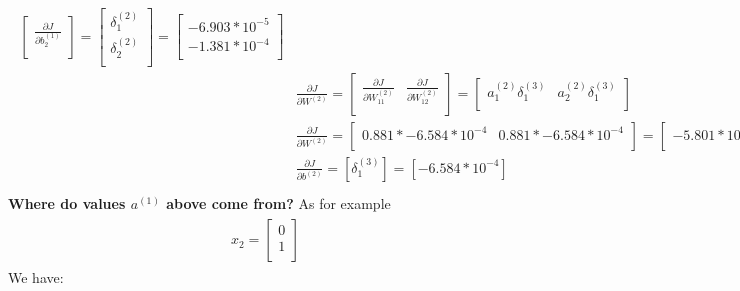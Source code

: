 \documentclass[leqno]{article}
\begin{document}
\begin{gather*}
\begin{split}
\begin{bmatrix}
  \frac{\partial J}{\partial b_2^{(1)}}\\
  \end{bmatrix}
  =
 \begin{bmatrix}
   \delta_1^{(2)}\\ 
   \delta_2^{(2)}\\
  \end{bmatrix}
  =
  \begin{bmatrix}
   -6.903*10^{-5}\\ 
   -1.381*10^{-4}\\
  \end{bmatrix}
\\
&\frac{\partial J}{\partial W^{(2)}} = 
 \begin{bmatrix}
   \frac{\partial J}{\partial W_{11}^{(2)}} & \frac{\partial J}{\partial W_{12}^{(2)}}\\ 
  \end{bmatrix}
  =
 \begin{bmatrix}
   a_1^{(2)}\delta_1^{(3)} & a_2^{(2)}\delta_1^{(3)}\\ 
  \end{bmatrix}
\\
&\frac{\partial J}{\partial W^{(2)}}   =
  \begin{bmatrix}
   0.881*-6.584*10^{-4} & 0.881*-6.584*10^{-4}\\ 
  \end{bmatrix}
  =
  \begin{bmatrix}
   -5.801*10^{-4} & -5.801*10^{-4}\\
  \end{bmatrix}
\\
&\frac{\partial J}{\partial b^{(2)}} = [\delta_1^{(3)}] = [-6.584*10^{-4}]\\
\end{split}
\end{gather*}
\textbf{Where do values $a^{(1)}$ above come from?}
As for example 
\begin{gather*}
\begin{split}
&x_2 =
  \begin{bmatrix}
  0\\
  1\\ 
  \end{bmatrix}
\end{split}
\end{gather*}
We have: 
\end{document}
